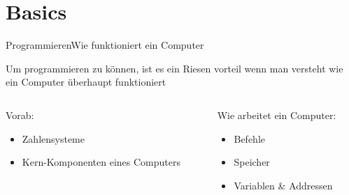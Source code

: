 \section{Basics}


\begin{frame}{Programmieren}{Wie funktioniert ein Computer}

	Um programmieren zu können, ist es ein Riesen vorteil wenn 
	man versteht wie ein Computer überhaupt funktioniert

 \begin{columns}[t]
     \begin{column}[T]{5cm} 
	    Vorab:
		\begin{itemize}
		\item Zahlensysteme
		\item Kern-Komponenten eines Computers
		\end{itemize}
     \end{column}
     \begin{column}[T]{5cm} 
        Wie arbeitet ein Computer:
		\begin{itemize}
		\item Befehle
		\item Speicher
		\item Variablen \& Addressen
		\end{itemize}
     \end{column}
     \end{columns}
     
\end{frame}



